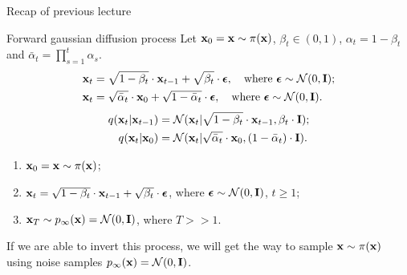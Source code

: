 \begin{frame}{Recap of previous lecture}
	\begin{block}{Forward gaussian diffusion process}
		Let $\mathbf{x}_0 = \mathbf{x} \sim \pi(\mathbf{x})$, $\beta_t \in (0, 1)$, $\alpha_t = 1 - \beta_t$ and $\bar{\alpha}_t = \prod_{s=1}^t \alpha_s$. 
		\begin{align*}
			\mathbf{x}_t &= \sqrt{1 - \beta_t} \cdot \mathbf{x}_{t - 1} + \sqrt{\beta_t} \cdot \boldsymbol{\epsilon}, \quad \text{where }\boldsymbol{\epsilon} \sim \mathcal{N}(0, \mathbf{I}); \\
			\mathbf{x}_t &= \sqrt{\bar{\alpha}_t} \cdot \mathbf{x}_{0} + \sqrt{1 - \bar{\alpha}_t} \cdot \boldsymbol{\epsilon}, \quad \text{where } \boldsymbol{\epsilon} \sim \mathcal{N}(0, \mathbf{I}).
		\end{align*}
		\vspace{-0.6cm}
		\begin{align*}
			q(\mathbf{x}_t | \mathbf{x}_{t-1}) &= \mathcal{N}(\mathbf{x}_t | \sqrt{1 - \beta_t} \cdot \mathbf{x}_{t-1}, \beta_t \cdot \mathbf{I}); \\
			q(\mathbf{x}_t | \mathbf{x}_0) &= \mathcal{N}(\mathbf{x}_t | \sqrt{\bar{\alpha}_t} \cdot \mathbf{x}_0, (1 - \bar{\alpha}_t) \cdot \mathbf{I}).
		\end{align*}
		\vspace{-0.6cm}
	\end{block}
	\begin{enumerate}
		\item $\mathbf{x}_0 = \mathbf{x} \sim \pi(\mathbf{x})$;
		\item $\mathbf{x}_t = \sqrt{1 - \beta_t} \cdot \mathbf{x}_{t - 1} + \sqrt{\beta_t} \cdot \boldsymbol{\epsilon}$, where $\boldsymbol{\epsilon} \sim \mathcal{N}(0, \mathbf{I})$, $t \geq 1$;
		\item $\mathbf{x}_T \sim p_{\infty}(\mathbf{x}) = \mathcal{N}(0, \mathbf{I})$, where $T >> 1$.
	\end{enumerate}
	If we are able to invert this process, we will get the way to sample $\mathbf{x} \sim \pi(\mathbf{x})$ using noise samples $p_{\infty}(\mathbf{x}) = \mathcal{N}(0, \mathbf{I})$.
\end{frame}
